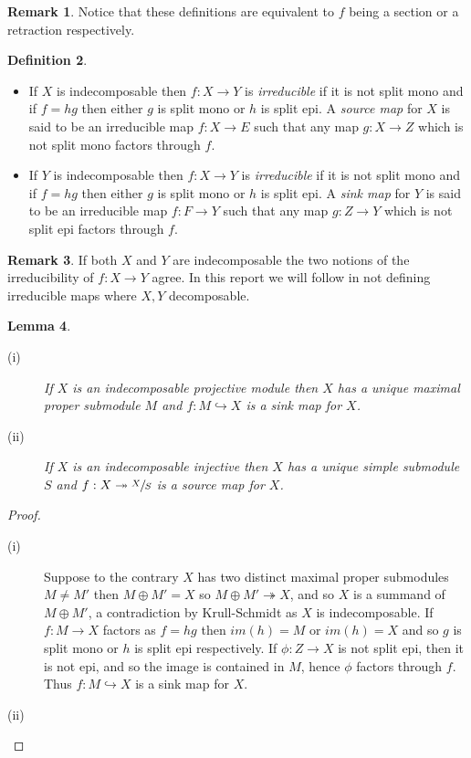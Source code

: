 \documentclass[11.5pt, twoside, a4paper, titlepage]{report}
\theoremstyle{definition}
\newtheorem{mydef}{Definition}[section]
\newtheorem{rem}[mydef]{Remark}
\theoremstyle{plain}
\newtheorem{lem}[mydef]{Lemma}
\begin{document}
\begin{rem}
Notice that these definitions are equivalent to $f$ being a section or a retraction respectively.
\end{rem}

\begin{mydef}
\begin{itemize}
\item If $X$ is indecomposable then $f:X \to Y$ is \emph{irreducible} if it is not split mono and if $f=hg$ then either $g$ is split mono or $h$ is split epi. A \emph{source map} for $X$ is said to be an irreducible map $f:X \to E$ such that any map $g: X \to Z$ which is not split mono factors through $f$.
\item If $Y$ is indecomposable then $f: X \to Y$ is \emph{irreducible} if it is not split mono and if $f=hg$ then either $g$ is split mono or $h$ is split epi. A \emph{sink map} for $Y$ is said to be an irreducible map $f: F \to Y$ such that any map $g: Z \to Y$ which is not split epi factors through $f$.
\end{itemize}
\end{mydef}

\begin{rem}
If both $X$ and $Y$ are indecomposable the two notions of the irreducibility of $f:X \to Y$ agree. In this report we will follow \cite{CB3} in not defining irreducible maps where $X,Y$ decomposable.
\end{rem}

\begin{lem}
\begin{description}
\item [(i)] If $X$ is an indecomposable projective module then $X$ has a unique maximal proper submodule $M$ and $f:M \hookrightarrow X$ is a sink map for $X$.
\item [(ii)] If $X$ is an indecomposable injective then $X$ has a unique simple submodule $S$ and $f:X \twoheadrightarrow \sfrac{X}{S}$ is a source map for $X$.
\end{description}
\end{lem}
\begin{proof}
\begin{description}
\item [(i)] Suppose to the contrary $X$ has two distinct maximal proper submodules $M\neq M'$ then $M \oplus M'=X$ so $M \oplus M' \twoheadrightarrow X$, and so $X$ is a summand of $M\oplus M'$, a contradiction by Krull-Schmidt as $X$ is indecomposable. If $f: M \to X$ factors as $f=hg$ then $im(h)=M$ or $im(h)=X$ and so $g$ is split mono or $h$ is split epi respectively. If $\phi: Z \to X$ is not split epi, then it is not epi, and so the image is contained in $M$, hence $\phi$ factors through $f$. Thus $f: M\hookrightarrow X$ is a sink map for $X$.
\item [(ii)]
\end{description}
\end{proof}
\end{document}
